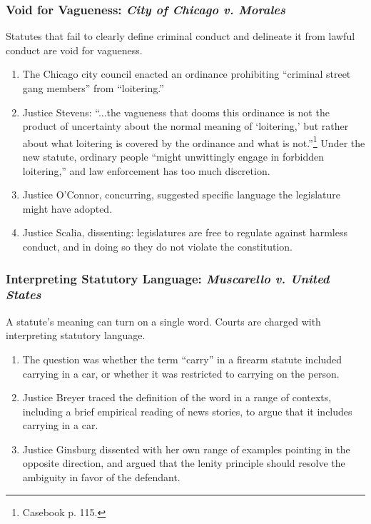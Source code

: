 \subsubsection{Void for Vagueness: \emph{City of Chicago v. Morales}}

Statutes that fail to clearly define criminal conduct and delineate it from 
lawful conduct are void for vagueness.

\begin{enumerate}
    \item The Chicago city council enacted an ordinance prohibiting ``criminal 
    street gang members'' from ``loitering.''
    \item Justice Stevens: ``...the vagueness that dooms this ordinance is not 
    the product of uncertainty about the normal meaning of `loitering,' but 
    rather about what loitering is covered by the ordinance and what is 
    not.''\footnote{Casebook p. 115.} Under the new statute, ordinary people 
    ``might unwittingly engage in forbidden loitering,'' and law enforcement 
    has too much discretion.
    \item Justice O'Connor, concurring, suggested specific language the 
    legislature might have adopted.
    \item Justice Scalia, dissenting: legislatures are free to regulate 
    against harmless conduct, and in doing so they do not violate the 
    constitution.
\end{enumerate}

\subsubsection{Interpreting Statutory Language: \emph{Muscarello v. United States}}

A statute's meaning can turn on a single word. Courts are charged with 
interpreting statutory language.

\begin{enumerate}
    \item The question was whether the term ``carry'' in a firearm statute 
    included carrying in a car, or whether it was restricted to carrying on 
    the person.
    \item Justice Breyer traced the definition of the word in a range of 
    contexts, including a brief empirical reading of news stories, to argue 
    that it includes carrying in a car.
    \item Justice Ginsburg dissented with her 
    own range of examples pointing in the opposite direction, and argued that 
    the lenity principle should resolve the ambiguity in favor of the 
    defendant.
\end{enumerate}


